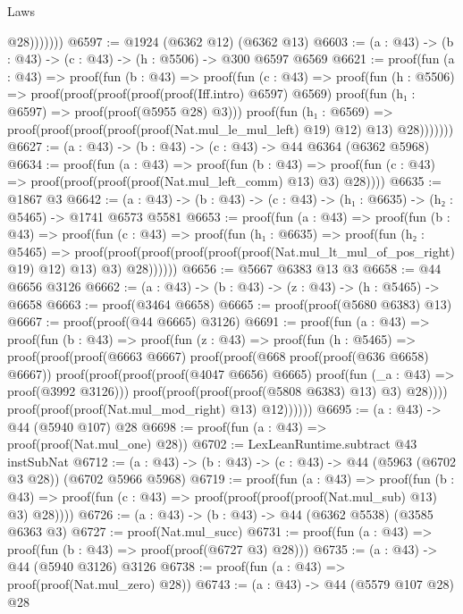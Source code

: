 \begin{lexlean}{Laws}
\begin{coremodule}
                  @28)))))))
@6597 := @1924 (@6362 @12) (@6362 @13)
@6603 := (a : @43) -> (b : @43) -> (c : @43) -> (h : @5506) -> @300 @6597 @6569
@6621 := proof(fun (a : @43) =>
    proof(fun (b : @43) =>
      proof(fun (c : @43) =>
        proof(fun (h : @5506) =>
          proof(proof(proof(proof(proof(Iff.intro) @6597) @6569)
                proof(fun (h₁ : @6597) => proof(proof(@5955 @28) @3)))
              proof(fun (h₁ : @6569) =>
                proof(proof(proof(proof(proof(Nat.mul_le_mul_left) @19) @12) @13) @28)))))))
@6627 := (a : @43) -> (b : @43) -> (c : @43) -> @44 @6364 (@6362 @5968)
@6634 := proof(fun (a : @43) =>
    proof(fun (b : @43) =>
      proof(fun (c : @43) => proof(proof(proof(proof(Nat.mul_left_comm) @13) @3) @28))))
@6635 := @1867 @3
@6642 := (a : @43) -> (b : @43) -> (c : @43) -> (h₁ : @6635) -> (h₂ : @5465) -> @1741 @6573 @5581
@6653 := proof(fun (a : @43) =>
    proof(fun (b : @43) =>
      proof(fun (c : @43) =>
        proof(fun (h₁ : @6635) =>
          proof(fun (h₂ : @5465) =>
            proof(proof(proof(proof(proof(proof(Nat.mul_lt_mul_of_pos_right) @19) @12) @13) @3)
                @28))))))
@6656 := @5667 @6383 @13 @3
@6658 := @44 @6656 @3126
@6662 := (a : @43) -> (b : @43) -> (z : @43) -> (h : @5465) -> @6658
@6663 := proof(@3464 @6658)
@6665 := proof(proof(@5680 @6383) @13)
@6667 := proof(proof(@44 @6665) @3126)
@6691 := proof(fun (a : @43) =>
    proof(fun (b : @43) =>
      proof(fun (z : @43) =>
        proof(fun (h : @5465) =>
          proof(proof(proof(@6663 @6667)
                proof(proof(@668 proof(proof(@636 @6658) @6667))
                    proof(proof(proof(proof(@4047 @6656) @6665)
                          proof(fun (_a : @43) => proof(@3992 @3126)))
                        proof(proof(proof(proof(@5808 @6383) @13) @3) @28))))
              proof(proof(proof(Nat.mul_mod_right) @13) @12))))))
@6695 := (a : @43) -> @44 (@5940 @107) @28
@6698 := proof(fun (a : @43) => proof(proof(Nat.mul_one) @28))
@6702 := LexLeanRuntime.subtract @43 instSubNat
@6712 := (a : @43) -> (b : @43) -> (c : @43) -> @44 (@5963 (@6702 @3 @28)) (@6702 @5966 @5968)
@6719 := proof(fun (a : @43) =>
    proof(fun (b : @43) =>
      proof(fun (c : @43) => proof(proof(proof(proof(Nat.mul_sub) @13) @3) @28))))
@6726 := (a : @43) -> (b : @43) -> @44 (@6362 @5538) (@3585 @6363 @3)
@6727 := proof(Nat.mul_succ)
@6731 := proof(fun (a : @43) => proof(fun (b : @43) => proof(proof(@6727 @3) @28)))
@6735 := (a : @43) -> @44 (@5940 @3126) @3126
@6738 := proof(fun (a : @43) => proof(proof(Nat.mul_zero) @28))
@6743 := (a : @43) -> @44 (@5579 @107 @28) @28

\end{coremodule}
\end{lexlean}
